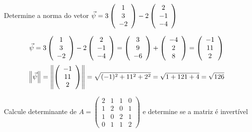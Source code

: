 \documentclass[a4paper,12pt,fleqn]{article}
\begin{document}
Determine a norma do vetor
\(
  \vec{\psi} = 3 \left(\begin{array}{c} 1 \\ 3 \\ -2 \end{array}\right) - 2 \left(\begin{array}{c} 2 \\ -1 \\ -4 \end{array}\right)
\)

\begin{answer}
  \[
    \vec{\psi}
    = 3 \left(\begin{array}{c} 1 \\ 3 \\ -2 \end{array}\right) - 2 \left(\begin{array}{c} 2 \\ -1 \\ -4 \end{array}\right)
    = \left(\begin{array}{c} 3 \\ 9 \\ -6 \end{array}\right) + \left(\begin{array}{c} -4 \\ 2 \\ 8 \end{array}\right)
    = \left(\begin{array}{c} -1 \\ 11 \\ 2 \end{array}\right)
  \]
  \[
    \norm{\vec{\psi}}
    = \norm{\vetortri{-1}{11}{2}}
    = \sqrt{(-1)^2+11^2+2^2}
    = \sqrt{1+121+4}
    = \sqrt{126}
  \]
\end{answer}

Calcule determinante de
\(
  A =
  \begin{pmatrix}
    2 & 1 & 1 & 0 \\
    1 & 2 & 0 & 1 \\
    1 & 0 & 2 & 1 \\
    0 & 1 & 1 & 2
  \end{pmatrix}
\)
e determine se a matriz é invertível
\end{document}
